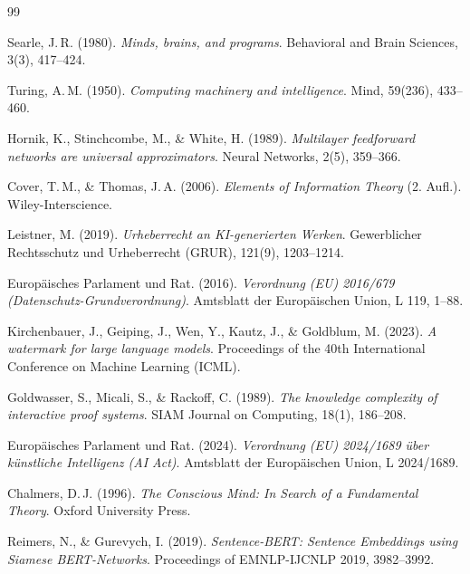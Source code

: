 ﻿\documentclass[a4paper,12pt]{article}
\theoremstyle{definition}
\begin{document}
\newpage

\begin{thebibliography}{99}

Searle, J.\,R. (1980).
\textit{Minds, brains, and programs}.
Behavioral and Brain Sciences, 3(3), 417--424.

Turing, A.\,M. (1950).
\textit{Computing machinery and intelligence}.
Mind, 59(236), 433--460.

Hornik, K., Stinchcombe, M., \& White, H. (1989).
\textit{Multilayer feedforward networks are universal approximators}.
Neural Networks, 2(5), 359--366.

Cover, T.\,M., \& Thomas, J.\,A. (2006).
\textit{Elements of Information Theory} (2. Aufl.).
Wiley-Interscience.

Leistner, M. (2019).
\textit{Urheberrecht an KI-generierten Werken}.
Gewerblicher Rechtsschutz und Urheberrecht (GRUR), 121(9), 1203--1214.

Europäisches Parlament und Rat. (2016).
\textit{Verordnung (EU) 2016/679 (Datenschutz-Grundverordnung)}.
Amtsblatt der Europäischen Union, L 119, 1--88.

Kirchenbauer, J., Geiping, J., Wen, Y., Kautz, J., \& Goldblum, M. (2023).
\textit{A watermark for large language models}.
Proceedings of the 40th International Conference on Machine Learning (ICML).

Goldwasser, S., Micali, S., \& Rackoff, C. (1989).
\textit{The knowledge complexity of interactive proof systems}.
SIAM Journal on Computing, 18(1), 186--208.

Europäisches Parlament und Rat. (2024).
\textit{Verordnung (EU) 2024/1689 über künstliche Intelligenz (AI Act)}.
Amtsblatt der Europäischen Union, L 2024/1689.

Chalmers, D.\,J. (1996).
\textit{The Conscious Mind: In Search of a Fundamental Theory}.
Oxford University Press.

Reimers, N., \& Gurevych, I. (2019).
\textit{Sentence-BERT: Sentence Embeddings using Siamese BERT-Networks}.
Proceedings of EMNLP-IJCNLP 2019, 3982--3992.


\end{thebibliography}
\end{document}
